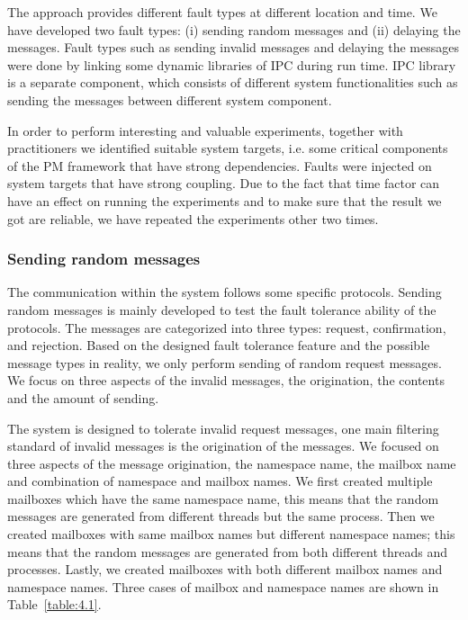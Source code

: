 The \approach{} approach provides different fault types at different location and time. We have developed two fault types: (i) sending random messages and (ii) delaying the messages. Fault types such as sending invalid messages and delaying the messages were done by linking some dynamic libraries of IPC during run time. IPC library is a separate component, which consists of different system functionalities such as sending the messages between different system component.

In order to perform interesting and valuable experiments, together with practitioners we identified suitable system targets, i.e.  
some critical components of the PM framework that have strong dependencies. Faults were injected on system targets that have strong coupling. Due to the fact that time factor can have an effect on running the experiments and to make sure that the result we got are reliable, we have repeated the experiments other two times. %

\subsubsection{Sending random messages}
The communication within the system follows some specific protocols.  Sending random messages is mainly developed to test the fault tolerance ability of the protocols. The messages are categorized into three types: request, confirmation, and rejection.  Based on the designed fault tolerance feature and the possible message types in reality, we only perform sending of random request messages. We focus on three aspects of the invalid messages, the origination, the contents and the amount of sending.

The system is designed to tolerate invalid request messages, one main filtering standard of invalid messages is the origination of the messages. We focused on three aspects of the message origination, the namespace name, the mailbox name and combination of namespace and mailbox names. We first created multiple mailboxes which have the same namespace name, this means that the random messages are generated from different threads but the same process. Then we created mailboxes with same mailbox names but different namespace names; this means that the random messages are generated from both different threads and processes. Lastly, we created mailboxes with both different mailbox names and namespace names. Three cases of mailbox and namespace names are shown in Table~\ref{table:4.1}.


